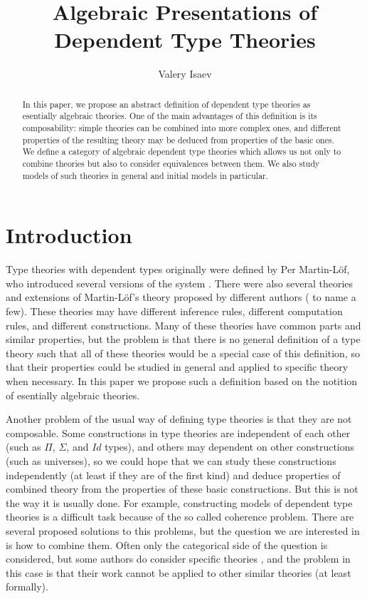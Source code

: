 \documentclass[reqno]{amsart}
\theoremstyle{definition}
\theoremstyle{remark}
\numberwithin{figure}{section}
\begin{document}
\title{Algebraic Presentations of Dependent Type Theories}

\author{Valery Isaev}

\begin{abstract}
In this paper, we propose an abstract definition of dependent type theories as esentially algebraic theories.
One of the main advantages of this definition is its composability: simple theories can be combined into more complex ones,
and different properties of the resulting theory may be deduced from properties of the basic ones.
We define a category of algebraic dependent type theories which allows us not only to combine theories but also to consider equivalences between them.
We also study models of such theories in general and initial models in particular.
\end{abstract}

\maketitle

 \makeatletter
    \providecommand\@dotsep{5}
  \makeatother
  \listoftodos\relax

\section{Introduction}

Type theories with dependent types originally were defined by Per Martin-L\"{o}f, who introduced several versions of the system \cite{MLTT72,MLTT73,MLTT79}.
There were also several theories and extensions of Martin-L\"{o}f's theory proposed by different authors (\cite{CoC,luo94} to name a few).
These theories may have different inference rules, different computation rules, and different constructions.
Many of these theories have common parts and similar properties,
but the problem is that there is no general definition of a type theory such that all of these theories would be a special case of this definition,
so that their properties could be studied in general and applied to specific theory when necessary.
In this paper we propose such a definition based on the notition of esentially algebraic theories.

Another problem of the usual way of defining type theories is that they are not composable.
Some constructions in type theories are independent of each other (such as $\Pi$, $\Sigma$, and $Id$ types),
and others may dependent on other constructions (such as universes),
so we could hope that we can study these constructions independently (at least if they are of the first kind)
and deduce properties of combined theory from the properties of these basic constructions.
But this is not the way it is usually done.
For example, constructing models of dependent type theories is a difficult task because of the so called coherence problem.
There are several proposed solutions to this problems, but the question we are interested in is how to combine them.
Often only the categorical side of the question is considered,
but some authors do consider specific theories \cite{streicher,pitts},
and the problem in this case is that their work cannot be applied to other similar theories (at least formally).
\end{document}
